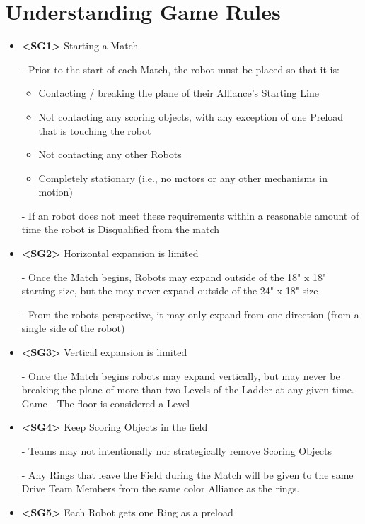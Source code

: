 \section*{Understanding Game Rules \vexManual}
{
\begin{itemize}
\item
\textbf{\textless SG1\textgreater} Starting a Match

- Prior to the start of each Match, the robot must be placed so that it is:
\begin{itemize}
    \item Contacting / breaking the plane of their Alliance's Starting Line
    \item Not contacting any scoring objects, with any exception of one Preload that is touching the robot
    \item Not contacting any other Robots 
    \item Completely stationary (i.e., no motors or any other mechanisms in motion)
\end{itemize}

- If an robot does not meet these requirements within a reasonable amount of time the robot is Disqualified from the match 
\item
\textbf{\textless SG2\textgreater} Horizontal expansion is limited

- Once the Match begins, Robots may expand outside of the 18" x 18" starting size, but the may never expand outside of the 24" x 18" size 

- From the robots perspective, it may only expand from one direction (from a single side of the robot)
\item
\textbf{\textless SG3\textgreater} Vertical expansion is limited

- Once the Match begins robots may expand vertically, but may never be breaking the plane of more than two Levels of the Ladder at any given time.  
Game
- The floor is considered a Level 
\item
\textbf{\textless SG4\textgreater} Keep Scoring Objects in the field 

- Teams may not intentionally nor strategically remove Scoring Objects

- Any Rings that leave the Field during the Match will be given to the same Drive Team Members from the same color Alliance as the rings.
\item
\textbf{\textless SG5\textgreater} Each Robot gets one Ring as a preload 


\end{itemize}}
